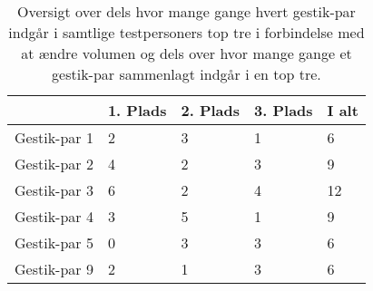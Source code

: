 %
\begin{table}[H]
	\centering
	\begin{tabular}{ | p{2.4cm} | p{2.4cm} | p{2.4cm} | p{2.4cm} |p{2.4cm}|}
		\hline
		& 1. Plads & 2. Plads & 3. Plads & I alt \\ \hline
		Gestik-par 1 & 2 & 3 & 1 & 6\\ \hline
		Gestik-par 2 & 4 & 2 & 3 & 9\\ \hline
		Gestik-par 3 & 6 & 2 & 4 & 12\\ \hline
		Gestik-par 4 & 3 & 5 & 1 & 9\\ \hline 
		Gestik-par 5 & 0 & 3 & 3 & 6\\ \hline
		Gestik-par 9 & 2 & 1 & 3 & 6\\ \hline
	\end{tabular}
	\caption{Oversigt over dels hvor mange gange hvert gestik-par indgår i samtlige testpersoners top tre i forbindelse med at ændre volumen og dels over hvor mange gange et gestik-par sammenlagt indgår i en top tre.}
	\label{tab:GestikParITopTrePauseVolumen}
\end{table}
\noindent
%
